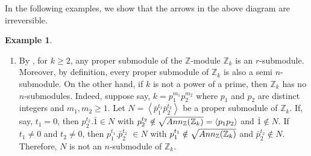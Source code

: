 \documentclass{amsart}%
\providecommand{\U}[1]{\protect\rule{.1in}{.1in}}
\theoremstyle{plain}
\newtheorem{example}{Example}
\numberwithin{equation}{section}
\begin{document}
In the following examples, we show that the arrows in the above diagram are irreversible.

\begin{example}
\label{ex5}
\end{example}

\begin{enumerate}
\item By \cite[Example 1]{Suat}, for $k\geq2$, any proper submodule of the $%
\mathbb{Z}
$-module $%
\mathbb{Z}
_{k}$ is an $r$-submodule. Moreover, by definition, every proper submodule of
$%
\mathbb{Z}
_{k}$ is also a semi $n$-submodule. On the other hand, if $k$ is not a power
of a prime, then $%
\mathbb{Z}
_{k}$ has no $n$-submodules. Indeed, suppose say, $k=p_{1}^{m_{1}}p_{2}%
^{m_{2}}$ where $p_{1}$ and $p_{2}$ are distinct integers and $m_{1},m_{2}%
\geq1$. Let $N=\left\langle \bar{p}_{1}^{t_{1}}\bar{p}_{2}^{t_{2}%
}\right\rangle $ be a proper submodule of $%
\mathbb{Z}
_{k}$. If, say, $t_{1}=0$, then $p_{2}^{t_{2}}.\bar{1}\in N$ with
$p_{2}^{t_{2}}\notin\sqrt{Ann_{%
\mathbb{Z}
}(%
\mathbb{Z}
_{k})}=\left\langle p_{1}p_{2}\right\rangle $ and $\bar{1}\notin N$. If
$t_{1}\neq0$ and $t_{2}\neq0$, then $p_{1}^{t_{1}}.\bar{p}_{2}^{t_{2}}$ $\in
N$ with $p_{1}^{t_{1}}\notin\sqrt{Ann_{%
\mathbb{Z}
}(%
\mathbb{Z}
_{k})}$ and $\bar{p}_{2}^{t_{2}}\notin N$. Therefore, $N$ is not an
$n$-submodule of $%
\mathbb{Z}
_{k}$.


\end{enumerate}
\end{document}
